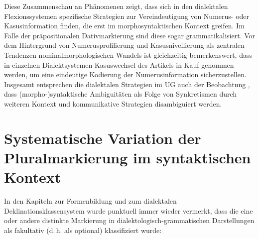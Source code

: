 Diese Zusammenschau an Phänomenen zeigt, dass sich in den dialektalen Flexionssystemen spezifische Strategien zur Vereindeutigung von Numerus- oder Kasusinformation finden, die erst im morphosyntaktischen Kontext greifen. Im Falle der präpositionalen Dativmarkierung sind diese sogar grammatikalisiert. Vor dem Hintergrund von Numerusprofilierung und Kasusnivellierung als zentralen Tendenzen nominalmorphologischen Wandels ist gleichzeitig bemerkenswert, dass in einzelnen Dialektsystemen Kasuswechsel des Artikels in Kauf genommen werden, um eine eindeutige Kodierung der Numerusinformation sicherzustellen. Insgesamt entsprechen die dialektalen Strategien im UG auch der Beobachtung , dass (morpho-)syntaktische Ambiguitäten als Folge von Synkretismen durch weiteren Kontext und kommunikative Strategien disambiguiert werden.

\section{Systematische Variation der Pluralmarkierung im syntaktischen Kontext}
\label{sec:9.2}
In den Kapiteln zur Formenbildung und zum dialektalen Deklinationsklassensystem wurde punktuell immer wieder vermerkt, dass die eine oder andere distinkte Markierung in dialektologisch-grammatischen Darstellungen als fakultativ (d.\,h. als optional) klassifiziert wurde:

